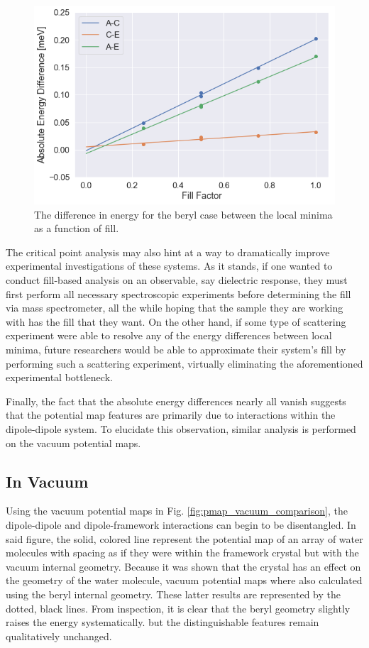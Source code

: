          \begin{figure}
             \centering
             \includegraphics[width=0.9\linewidth]{Figures/System/pmap_cp_diff.png}
             \caption{The difference in energy for the beryl case between the local minima as a function of fill.}
             \label{fig:pmap_cp_diff}
         \end{figure}
         
         The critical point analysis may also hint at a way to dramatically improve experimental investigations of these systems. As it stands, if one wanted to conduct fill-based analysis on an observable, say dielectric response, they must first perform all necessary spectroscopic experiments before determining the fill via mass spectrometer, all the while hoping that the sample they are working with has the fill that they want. On the other hand, if some type of scattering experiment were able to resolve any of the energy differences between local minima, future researchers would be able to approximate their system's fill by performing such a scattering experiment, virtually eliminating the aforementioned experimental bottleneck.
         
         Finally, the fact that the absolute energy differences nearly all vanish suggests that the potential map features are primarily due to interactions within the dipole-dipole system. To elucidate this observation, similar analysis is performed on the vacuum potential maps.

        \subsection{In Vacuum}
        \label{sec:fine_sweep_Vacuum}
        
        Using the vacuum potential maps in Fig. \ref{fig:pmap_vacuum_comparison}, the dipole-dipole and dipole-framework interactions can begin to be disentangled. In said figure, the solid, colored line represent the potential map of an array of water molecules with spacing as if they were within the framework crystal but with the vacuum internal geometry. Because it was shown that the crystal has an effect on the geometry of the water molecule, vacuum potential maps where also calculated using the beryl internal geometry. These latter results are represented by the dotted, black lines. From inspection, it is clear that the beryl geometry slightly raises the energy systematically. but the distinguishable features remain qualitatively unchanged.
        
